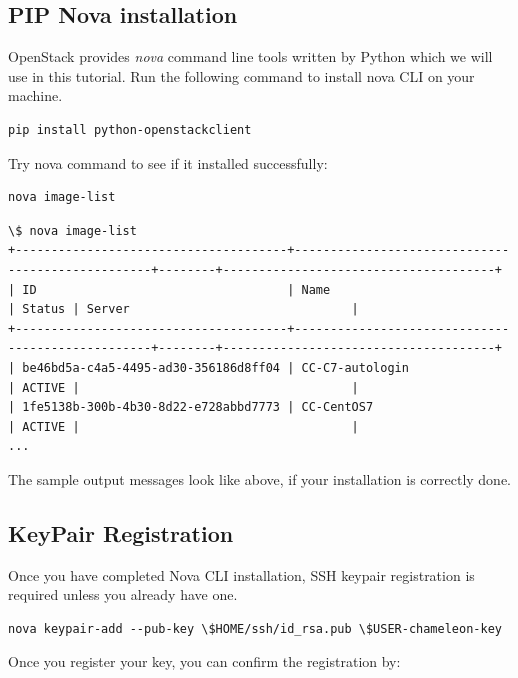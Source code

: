 \subsection{PIP Nova installation}

OpenStack provides \textit{nova} command line tools written by Python
which we will use in this tutorial. Run the following command to
install nova CLI on your machine.

\begin{lstlisting}
pip install python-openstackclient
\end{lstlisting}

Try nova command to see if it installed successfully:

\begin{lstlisting}
nova image-list
\end{lstlisting}

\begin{lstlisting}
\$ nova image-list
+--------------------------------------+--------------------------------------------------+--------+--------------------------------------+
| ID                                   | Name                                             | Status | Server                               |
+--------------------------------------+--------------------------------------------------+--------+--------------------------------------+
| be46bd5a-c4a5-4495-ad30-356186d8ff04 | CC-C7-autologin                                  | ACTIVE |                                      |
| 1fe5138b-300b-4b30-8d22-e728abbd7773 | CC-CentOS7                                       | ACTIVE |                                      |
...
\end{lstlisting}

The sample output messages look like above, if your installation is correctly
done.

\subsection{KeyPair Registration}

Once you have completed Nova CLI installation, SSH keypair registration is
required unless you already have one.

\begin{lstlisting}
nova keypair-add --pub-key \$HOME/ssh/id_rsa.pub \$USER-chameleon-key
\end{lstlisting}

Once you register your key, you can confirm the registration by:


